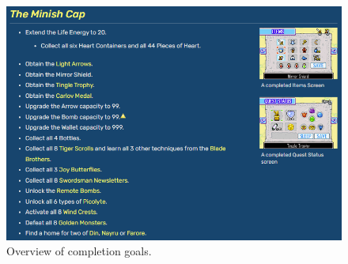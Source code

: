 


\newpage
{}


\newpage

\begin{figure}[H]
		\centering
		\includegraphics[scale=2]{Completion/overview}
		\caption{Overview of completion goals.}
	\end{figure}
	
\newpage

\etocsettocstyle{}{}
\localtableofcontents


\newpage
{}


